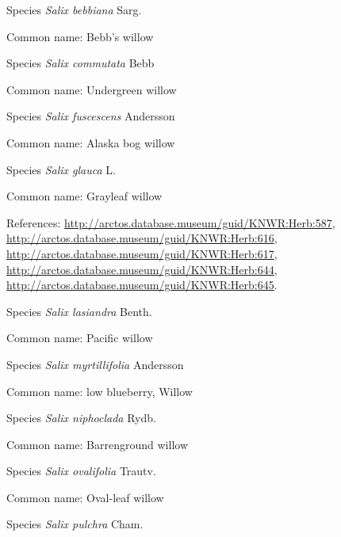 \documentclass[9pt, article]{memoir}
\begin{document}
\begin{multicols}{2}
\vspace{6pt}\noindent\hspace{36pt}Species \textit{Salix bebbiana} Sarg.


Common name: Bebb's willow

\vspace{6pt}\noindent\hspace{36pt}Species \textit{Salix commutata} Bebb


Common name: Undergreen willow

\vspace{6pt}\noindent\hspace{36pt}Species \textit{Salix fuscescens} Andersson


Common name: Alaska bog willow

\vspace{6pt}\noindent\hspace{36pt}Species \textit{Salix glauca} L.


Common name: Grayleaf willow

References: 
\url{http://arctos.database.museum/guid/KNWR:Herb:587}, 
\url{http://arctos.database.museum/guid/KNWR:Herb:616}, 
\url{http://arctos.database.museum/guid/KNWR:Herb:617}, 
\url{http://arctos.database.museum/guid/KNWR:Herb:644}, 
\url{http://arctos.database.museum/guid/KNWR:Herb:645}.

\vspace{6pt}\noindent\hspace{36pt}Species \textit{Salix lasiandra} Benth.


Common name: Pacific willow

\vspace{6pt}\noindent\hspace{36pt}Species \textit{Salix myrtillifolia} Andersson


Common name: low blueberry, Willow

\vspace{6pt}\noindent\hspace{36pt}Species \textit{Salix niphoclada} Rydb.


Common name: Barrenground willow

\vspace{6pt}\noindent\hspace{36pt}Species \textit{Salix ovalifolia} Trautv.


Common name: Oval-leaf willow

\vspace{6pt}\noindent\hspace{36pt}Species \textit{Salix pulchra} Cham.



\end{multicols}
\end{document}
